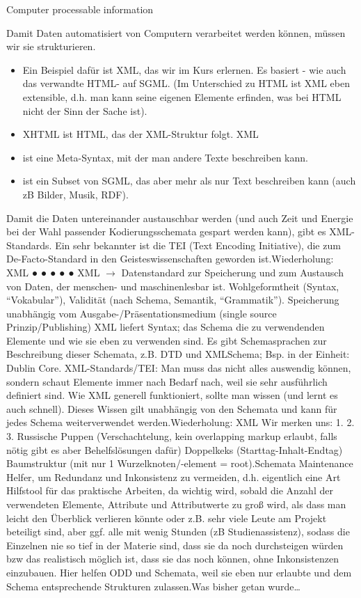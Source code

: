 

\begin{frame}{Computer processable information}
    

Damit Daten automatisiert von Computern verarbeitet werden können, müssen wir sie
strukturieren.
\begin{itemize}
\item Ein Beispiel dafür ist XML, das wir im Kurs erlernen. Es basiert - wie auch das verwandte
HTML- auf SGML. (Im Unterschied zu HTML ist XML eben extensible, d.h. man kann seine
eigenen Elemente erfinden, was bei HTML nicht der Sinn der Sache ist).
\item XHTML ist HTML, das der XML-Struktur folgt.
XML
\item ist eine Meta-Syntax, mit der man andere Texte beschreiben kann.
\item ist ein Subset von SGML, das aber mehr als nur Text beschreiben kann (auch zB Bilder,
Musik, RDF).
\end{itemize}
Damit die Daten untereinander austauschbar werden (und auch Zeit und Energie bei der Wahl
passender Kodierungsschemata gespart werden kann), gibt es XML-Standards.
Ein sehr bekannter ist die TEI (Text Encoding Initiative), die zum De-Facto-Standard in den
Geisteswissenschaften geworden ist.Wiederholung: XML
●
●
●
●
●
XML $\to$ Datenstandard zur Speicherung und zum Austausch von Daten, der menschen- und
maschinenlesbar ist.
Wohlgeformtheit (Syntax, “Vokabular”), Validität (nach Schema, Semantik, “Grammatik”).
Speicherung unabhängig vom Ausgabe-/Präsentationsmedium (single source
Prinzip/Publishing)
XML liefert Syntax; das Schema die zu verwendenden Elemente und wie sie eben zu verwenden
sind. Es gibt Schemasprachen zur Beschreibung dieser Schemata, z.B. DTD und XMLSchema;
Bsp. in der Einheit: Dublin Core.
XML-Standards/TEI: Man muss das nicht alles auswendig können, sondern schaut Elemente
immer nach Bedarf nach, weil sie sehr ausführlich definiert sind. Wie XML generell funktioniert,
sollte man wissen (und lernt es auch schnell). Dieses Wissen gilt unabhängig von den Schemata
und kann für jedes Schema weiterverwendet werden.Wiederholung: XML
Wir merken uns:
1.
2.
3.
Russische Puppen (Verschachtelung, kein
overlapping markup erlaubt, falls nötig gibt es aber
Behelfslösungen dafür)
Doppelkeks (Starttag-Inhalt-Endtag)
Baumstruktur (mit nur 1 Wurzelknoten/-element =
root).Schemata
Maintenance Helfer, um Redundanz und Inkonsistenz zu vermeiden, d.h. eigentlich eine Art
Hilfstool für das praktische Arbeiten, da wichtig wird, sobald die Anzahl der verwendeten Elemente,
Attribute und Attributwerte zu groß wird, als dass man leicht den Überblick verlieren könnte oder z.B. sehr
viele Leute am Projekt beteiligt sind, aber ggf. alle mit wenig Stunden (zB Studienassistenz), sodass die
Einzelnen nie so tief in der Materie sind, dass sie da noch durchsteigen würden bzw das realistisch
möglich ist, dass sie das noch können, ohne Inkonsistenzen einzubauen. Hier helfen ODD und Schemata,
weil sie eben nur erlaubte und dem Schema entsprechende Strukturen zulassen.Was bisher getan wurde\dots
\end{frame}
